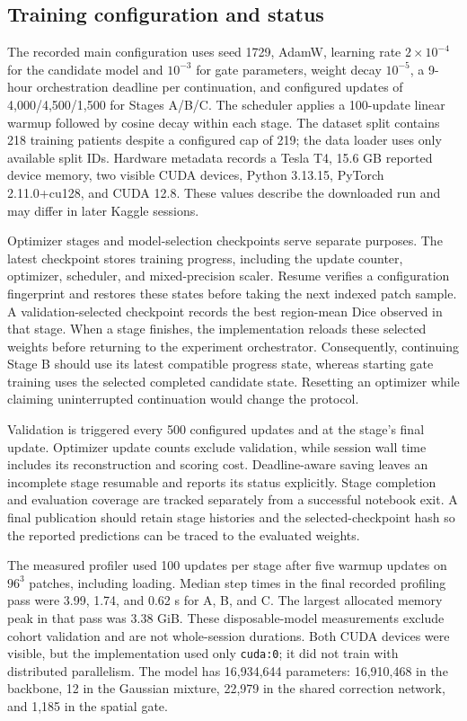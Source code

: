 \documentclass[conference]{IEEEtran}
\begin{document}
\subsection{Training configuration and status}
The recorded main configuration uses seed 1729, AdamW, learning rate $2\times10^{-4}$ for the candidate model and $10^{-3}$ for gate parameters, weight decay $10^{-5}$, a 9-hour orchestration deadline per continuation, and configured updates of 4,000/4,500/1,500 for Stages A/B/C. The scheduler applies a 100-update linear warmup followed by cosine decay within each stage. The dataset split contains 218 training patients despite a configured cap of 219; the data loader uses only available split IDs. Hardware metadata records a Tesla T4, 15.6 GB reported device memory, two visible CUDA devices, Python 3.13.15, PyTorch 2.11.0+cu128, and CUDA 12.8. These values describe the downloaded run and may differ in later Kaggle sessions.

Optimizer stages and model-selection checkpoints serve separate purposes. The latest checkpoint stores training progress, including the update counter, optimizer, scheduler, and mixed-precision scaler. Resume verifies a configuration fingerprint and restores these states before taking the next indexed patch sample. A validation-selected checkpoint records the best region-mean Dice observed in that stage. When a stage finishes, the implementation reloads these selected weights before returning to the experiment orchestrator. Consequently, continuing Stage B should use its latest compatible progress state, whereas starting gate training uses the selected completed candidate state. Resetting an optimizer while claiming uninterrupted continuation would change the protocol.

Validation is triggered every 500 configured updates and at the stage's final update. Optimizer update counts exclude validation, while session wall time includes its reconstruction and scoring cost. Deadline-aware saving leaves an incomplete stage resumable and reports its status explicitly. Stage completion and evaluation coverage are tracked separately from a successful notebook exit. A final publication should retain stage histories and the selected-checkpoint hash so the reported predictions can be traced to the evaluated weights.

The measured profiler used 100 updates per stage after five warmup updates on $96^3$ patches, including loading. Median step times in the final recorded profiling pass were 3.99, 1.74, and 0.62 s for A, B, and C. The largest allocated memory peak in that pass was 3.38 GiB. These disposable-model measurements exclude cohort validation and are not whole-session durations. Both CUDA devices were visible, but the implementation used only \texttt{cuda:0}; it did not train with distributed parallelism. The model has 16,934,644 parameters: 16,910,468 in the backbone, 12 in the Gaussian mixture, 22,979 in the shared correction network, and 1,185 in the spatial gate.
\end{document}
